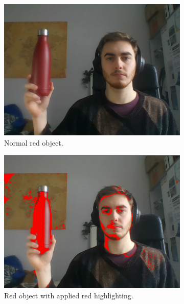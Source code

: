 \documentclass{l4proj}
\begin{document}
\begin{appendices}
\begin{figure}[!ht]
    \begin{subfigure}{0.42\textwidth}
        \centering
        \includegraphics[width=\textwidth]{images/colour-conversion-red-before.pdf}
        \caption{Normal red object.}
        \label{fig:colour-conversion-red-before} 
    \end{subfigure}
    \begin{subfigure}{0.42\textwidth}
        \centering
        \includegraphics[width=\textwidth]{images/colour-conversion-red-after.pdf}
        \caption{Red object with applied red highlighting.}
        \label{fig:colour-conversion-red-after} 
    \end{subfigure}
    \begin{subfigure}{0.42\textwidth}

\end{subfigure}
\end{figure}
\end{appendices}
\end{document}
